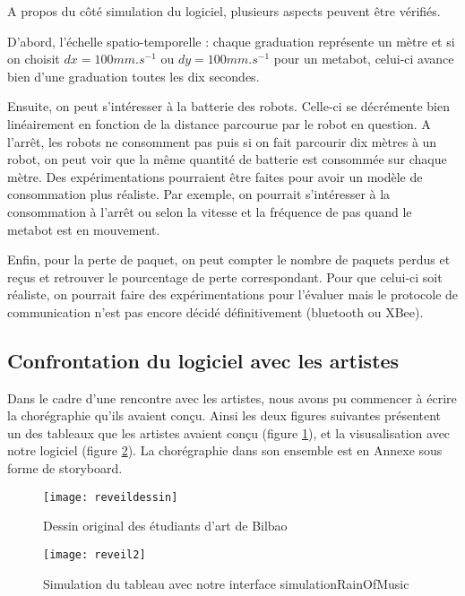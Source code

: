 A propos du côté simulation du logiciel, plusieurs aspects peuvent être vérifiés.

D'abord, l'échelle spatio-temporelle : chaque graduation représente un mètre et si on choisit $dx=100 mm.s^{-1}$ ou $dy=100 mm.s^{-1}$ pour un metabot, celui-ci avance bien d'une graduation toutes les dix secondes.

Ensuite, on peut s'intéresser à la batterie des robots. Celle-ci se décrémente bien linéairement en fonction de la distance parcourue par le robot en question. A l'arrêt, les robots ne consomment pas puis si on fait parcourir dix mètres à un robot, on peut voir que la même quantité de batterie est consommée sur chaque mètre. Des expérimentations pourraient être faites pour avoir un modèle de consommation plus réaliste. Par exemple, on pourrait s'intéresser à la consommation à l'arrêt ou selon la vitesse et la fréquence de pas quand le metabot est en mouvement.

Enfin, pour la perte de paquet, on peut compter le nombre de paquets perdus et reçus et retrouver le pourcentage de perte correspondant. Pour que celui-ci soit réaliste, on pourrait faire des expérimentations pour l'évaluer mais le protocole de communication n'est pas encore décidé définitivement (bluetooth ou XBee). 

\subsection{Confrontation du logiciel avec les artistes}

Dans le cadre d'une rencontre avec les artistes, nous avons pu commencer à écrire la chorégraphie qu'ils avaient conçu. Ainsi les deux figures suivantes présentent un des tableaux que les artistes avaient conçu (figure \ref{chore}), et la visusalisation avec notre logiciel (figure \ref{reveil}). La chorégraphie dans son ensemble est en Annexe sous forme de storyboard. 


\begin{figure}[H]
\centering
\texttt{[image: reveildessin]}
\caption{Dessin original des étudiants d'art de Bilbao}
\label{chore}
\end{figure}


\begin{figure} [H]
\centering
\texttt{[image: reveil2]}
\caption{Simulation du tableau avec notre interface simulationRainOfMusic}
\label{reveil}
\end{figure}

